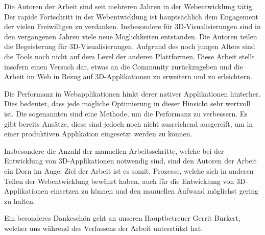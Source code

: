 Die Autoren der Arbeit sind seit mehreren Jahren in der Webentwicklung tätig. Der rapide Fortschritt in der Webentwicklung ist hauptsächlich dem Engagement der vielen Freiwilligen zu verdanken.
Insbesondere für 3D-Visualisierungen sind in den vergangenen Jahren viele neue Möglichkeiten entstanden. Die Autoren teilen die Begeisterung für 3D-Visualisierungen. Aufgrund des noch jungen Alters sind die Tools noch nicht auf dem Level der anderen Plattformen. Diese Arbeit stellt insofern einen Versuch dar, etwas an die Community zurückzugeben und die Arbeit im Web in Bezug auf 3D-Applikationen zu erweitern und zu erleichtern.

Die Performanz in Webapplikationen hinkt derer nativer Applikationen hinterher. Dies bedeutet, dass jede mögliche Optimierung in dieser Hinsicht sehr wertvoll ist. Die sogenannten  sind eine Methode, um die Performanz zu verbessern. Es gibt bereits Ansätze, diese sind jedoch noch nicht ausreichend ausgereift, um in einer produktiven Applikation eingesetzt werden zu können.

Insbesondere die Anzahl der manuellen Arbeitsschritte, welche bei der Entwicklung von 3D-Applikationen notwendig sind, sind den Autoren der Arbeit ein Dorn im Auge. Ziel der Arbeit ist es somit, Prozesse, welche sich in anderen Teilen der Webentwicklung bewährt haben, auch für die Entwicklung von 3D-Applikationen einsetzen zu können und den manuellen Aufwand möglichst gering zu halten.

Ein besonderes Dankeschön geht an unseren Hauptbetreuer Gerrit Burkert, welcher uns während des Verfassens der Arbeit unterstützt hat.